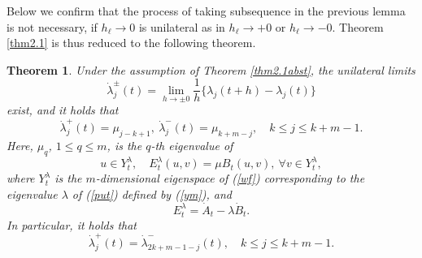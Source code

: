 \documentclass[final,a4paper]{jmsj}
\theoremstyle{thmstyleone}%
\newtheorem{theorem}{Theorem}
\theoremstyle{thmstyletwo}%
\theoremstyle{thmstylethree}%
\begin{document}
Below we confirm that the process of taking subsequence in the previous lemma is not necessary, if $h_\ell\rightarrow 0$ is unilateral as in $h_\ell\rightarrow +0$ or $h_\ell\rightarrow -0$. Theorem \ref{thm2.1} is thus reduced to the following theorem.  

\begin{theorem}\label{thm4}
Under the assumption of Theorem \ref{thm2.1abst}, the unilateral limits    
\begin{equation} 
\dot \lambda_j^\pm(t)=\lim_{h\rightarrow \pm 0}\frac{1}{h}\{ \lambda_j(t+h)-\lambda_j(t)\} 
 \label{49} 
\end{equation} 
exist, and it holds that 
\begin{equation}  
\dot \lambda^+_j(t)=\mu_{j-k+1}, \ \dot\lambda_j^-(t)=\mu_{k+m-j}, \quad k\leq j\leq k+m-1. 
 \label{pm}
\end{equation} 
Here, $\mu_{q}$, $1\leq q\leq m$, is the $q$-th eigenvalue of 
\begin{equation} 
u\in Y_t^\lambda, \quad E^\lambda_{t}(u,v)=\mu B_t(u,v), \ \forall v\in Y_t^\lambda,  
 \label{51}
\end{equation} 
where $Y_t^\lambda$ is the $m$-dimensional eigenspace of (\ref{wf}) corresponding to the eigenvalue $\lambda$ of  (\ref{put}) defined by (\ref{ym}), and   
\begin{equation} 
E^\lambda_{t}=\dot A_{t}-\lambda \dot B_{t}. 
 \label{et}
\end{equation} 
In particular, it holds that 
\[ \dot \lambda_j^+(t)=\dot \lambda_{2k+m-1-j}^-(t), \quad k\leq j\leq k+m-1. \] 
\end{theorem} 
\end{document}
